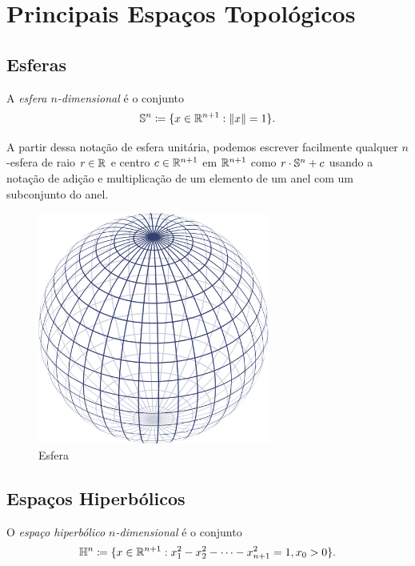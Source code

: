 





\chapter{Principais Espaços Topológicos}

\section{Esferas}

\begin{defi}
	A \emph{esfera $n$-dimensional} é o conjunto
	\begin{equation*}
	\Es^n \coloneqq \{x \in \R^{n+1}: \nor{x}=1\}.
	\end{equation*}
\end{defi}

A partir dessa notação de esfera unitária, podemos escrever facilmente qualquer $n$-esfera de raio $r \in \mathbb{R}$ e centro $c \in \mathbb{R}^{n+1}$ em $\mathbb{R}^{n+1}$ como $r \cdot \mathbb{S}^n + c$ usando a notação de adição e multiplicação de um elemento de um anel com um subconjunto do anel.

\begin{figure}[!h]
\centering
\includegraphics[width=3in]{./imagens/esfera}
\caption{Esfera}
\end{figure}


\section{Espaços Hiperbólicos}

\begin{defi}
	O \emph{espaço hiperbólico $n$-dimensional} é o conjunto
	\begin{equation*}
	\Hip^n \coloneqq \{x \in \R^{n+1}: x_1^2-x_2^2-\cdots -x_{n+1}^2=1,\\ x_0>0 \}.
	\end{equation*}
\end{defi}

